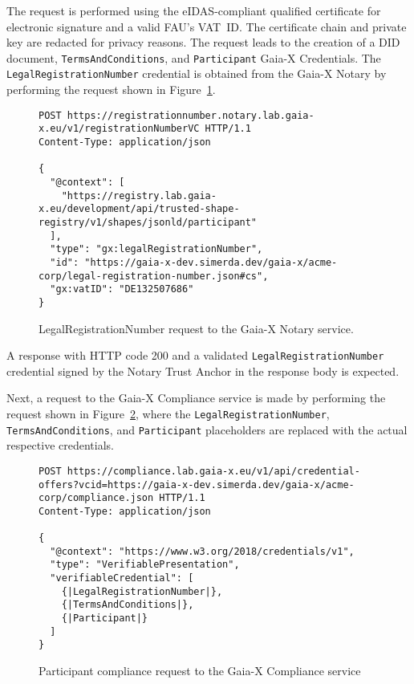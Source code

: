 The request is performed using the eIDAS-compliant qualified certificate for electronic signature and a valid FAU's VAT~ID.
The certificate chain and private key are redacted for privacy reasons.
The request leads to the creation of a DID document, \texttt{TermsAndConditions}, and \texttt{Participant} Gaia-X Credentials.
The \texttt{LegalRegistrationNumber} credential is obtained from the Gaia-X Notary by performing the request shown in Figure~\ref{fig:test_case_1_notary}.

\begin{figure}[h]
    \centering
    \begin{verbatim}
POST https://registrationnumber.notary.lab.gaia-x.eu/v1/registrationNumberVC HTTP/1.1
Content-Type: application/json

{
  "@context": [
    "https://registry.lab.gaia-x.eu/development/api/trusted-shape-registry/v1/shapes/jsonld/participant"
  ],
  "type": "gx:legalRegistrationNumber",
  "id": "https://gaia-x-dev.simerda.dev/gaia-x/acme-corp/legal-registration-number.json#cs",
  "gx:vatID": "DE132507686"
}
    \end{verbatim}
    \captionsetup{width=\textwidth}
    \caption{LegalRegistrationNumber request to the Gaia-X Notary service.}\label{fig:test_case_1_notary}
\end{figure}

A response with HTTP code 200 and a validated \texttt{LegalRegistrationNumber} credential signed by the Notary Trust Anchor in the response body is expected.

Next, a request to the Gaia-X Compliance service is made by performing the request shown in Figure~\ref{fig:test_case_1_compliance}, where the \texttt{LegalRegistrationNumber}, \texttt{TermsAndConditions}, and \texttt{Participant} placeholders are replaced with the actual respective credentials.

\begin{figure}[h]
    \centering
    \begin{verbatim}
POST https://compliance.lab.gaia-x.eu/v1/api/credential-offers?vcid=https://gaia-x-dev.simerda.dev/gaia-x/acme-corp/compliance.json HTTP/1.1
Content-Type: application/json

{
  "@context": "https://www.w3.org/2018/credentials/v1",
  "type": "VerifiablePresentation",
  "verifiableCredential": [
    {|LegalRegistrationNumber|},
    {|TermsAndConditions|},
    {|Participant|}
  ]
}
    \end{verbatim}
    \caption{Participant compliance request to the Gaia-X Compliance service}\label{fig:test_case_1_compliance}
\end{figure}

